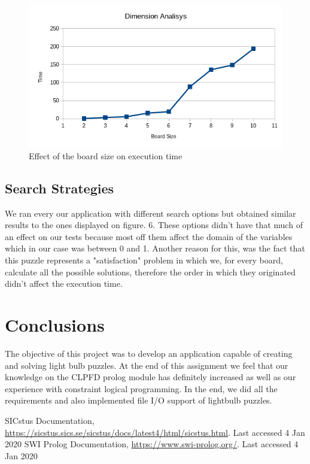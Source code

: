 \documentclass[runningheads]{llncs}
\begin{document}
\begin{figure}
	\includegraphics[scale=0.5]{graph}
	\centering
	\caption{Effect of the board size on execution time}
	\centering
\end{figure}

\subsection{Search Strategies}
We ran every our application with different search options but obtained similar results to the ones displayed on figure. 6. These options didn't have that much of an effect on our tests because most off them affect the domain of the variables which in our case was between 0 and 1. Another reason for this, was the fact that this puzzle represents a "satisfaction" problem in which we, for every board, calculate all the possible solutions, therefore the order in which they originated didn't affect the execution time.

\section{Conclusions}
The objective of this project was to develop an application capable of creating and solving light bulb puzzles. At the end of this assignment we feel that our knowledge on the CLPFD prolog module has definitely increased as well as our experience with constraint logical programming.\hfill \break
In the end, we did all the requirements and also implemented file I/O support of lightbulb puzzles.

%
%
% 
% 
%
\begin{thebibliography}{8}
SICstus Documentation, \url{https://sicstus.sics.se/sicstus/docs/latest4/html/sicstus.html}. Last accessed 4
Jan 2020
SWI Prolog Documentation, \url{https://www.swi-prolog.org/}. Last accessed 4
Jan 2020
\end{thebibliography}
\end{document}
